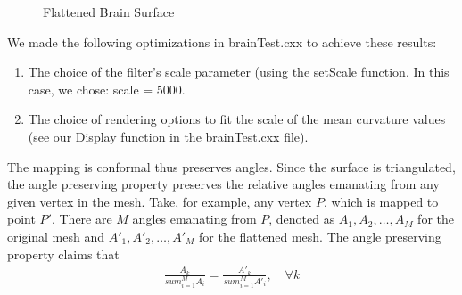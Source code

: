\documentclass{InsightArticle}
\begin{document}
  \begin{figure}[h]
		\begin{center}
    \end{center}
    \vspace{-.25in} \caption{Flattened Brain Surface}
  \end{figure}  

  We made the following optimizations in brainTest.cxx to achieve
  these results:

  \begin{enumerate}
  \item The choice of the filter's scale parameter (using the setScale
  function. In this case, we chose: scale = 5000.
  \item The choice of rendering options to fit the scale of the mean
  curvature values (see our Display function in the brainTest.cxx
  file).
  \end{enumerate}
  
  The mapping is conformal thus preserves angles. Since the surface is
  triangulated, the angle preserving property preserves the relative
  angles emanating from any given vertex in the mesh. Take, for
  example, any vertex $P$, which is mapped to point $P'$. There are
  $M$ angles emanating from $P$, denoted as $A_1, A_2, \hdots ,A_M$
  for the original mesh and $A'_1, A'_2, \hdots ,A'_M$ for the
  flattened mesh. The angle preserving property claims that
  \begin{eqnarray}
    \frac{A_k}{sum_{i=1}^M A_i} = \frac{A'_k}{sum_{i=1}^M A'_i}, \quad \forall k
    \label{anglePreserve}
  \end{eqnarray} 
  
\end{document}
